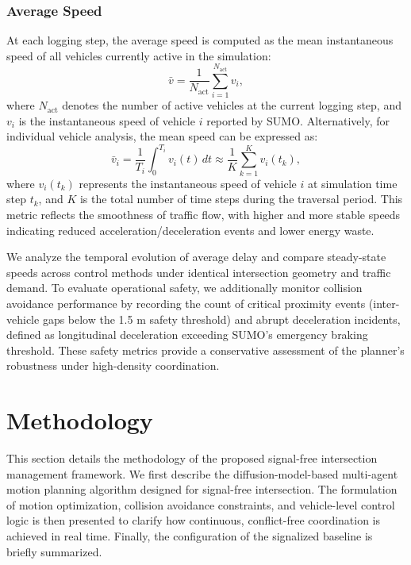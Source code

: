 \documentclass[journal]{IEEEtran}
\begin{document}
\subsubsection{Average Speed} 
At each logging step, the average speed is computed as the mean instantaneous speed of all vehicles currently active in the simulation:
\begin{equation}
\bar{v} = \frac{1}{N_{\mathrm{act}}} \sum_{i=1}^{N_{\mathrm{act}}} v_i,
\end{equation}
where $N_{\mathrm{act}}$ denotes the number of active vehicles at the current logging step, and $v_i$ is the instantaneous speed of vehicle $i$ reported by SUMO. Alternatively, for individual vehicle analysis, the mean speed can be expressed as:
\begin{equation}
\bar{v}_i = \frac{1}{T_i} \int_{0}^{T_i} v_i(t) \, dt \approx \frac{1}{K} \sum_{k=1}^{K} v_i(t_k),
\end{equation}
where $v_i(t_k)$ represents the instantaneous speed of vehicle $i$ at simulation time step $t_k$, and $K$ is the total number of time steps during the traversal period. This metric reflects the smoothness of traffic flow, with higher and more stable speeds indicating reduced acceleration/deceleration events and lower energy waste.


We analyze the temporal evolution of average delay and compare steady-state speeds across control methods under identical intersection geometry and traffic demand. To evaluate operational safety, we additionally monitor collision avoidance performance by recording the count of critical proximity events (inter-vehicle gaps below the 1.5 m safety threshold) and abrupt deceleration incidents, defined as longitudinal deceleration exceeding SUMO's emergency braking threshold. These safety metrics provide a conservative assessment of the planner's robustness under high-density coordination.

\section{Methodology}

This section details the methodology of the proposed signal-free intersection management framework. We first describe the diffusion-model-based multi-agent motion planning algorithm designed for signal-free intersection. The formulation of motion optimization, collision avoidance constraints, and vehicle-level control logic is then presented to clarify how continuous, conflict-free coordination is achieved in real time. Finally, the configuration of the signalized baseline is briefly summarized.
\end{document}
